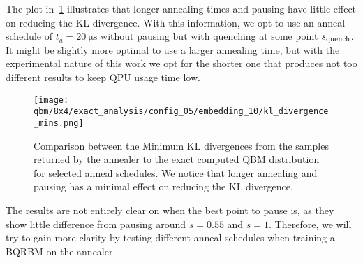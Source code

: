 The plot in~\cref{fig:dkl_mins_embedding_05} illustrates that longer annealing times and pausing have little effect on reducing the KL divergence.
With this information, we opt to use an anneal schedule of \( t_a = 20 \ \si{\micro\second} \) without pausing but with quenching at some point \( s_{\text{quench}} \).
It might be slightly more optimal to use a larger annealing time, but with the experimental nature of this work we opt for the shorter one that produces not too different results to keep QPU usage time low.

\begin{figure}[!htb]
    \begin{center}
        \texttt{[image: qbm/8x4/exact\_analysis/config\_05/embedding\_10/kl\_divergence\_mins.png]}
    \end{center}
    \caption{Comparison between the Minimum KL divergences from the samples returned by the annealer to the exact computed QBM distribution for selected anneal schedules. We notice that longer annealing and pausing has a minimal effect on reducing the KL divergence.}
    \label{fig:dkl_mins_embedding_05}
\end{figure}

The results are not entirely clear on when the best point to pause is, as they show little difference from pausing around \( s = 0.55 \) and \( s = 1 \).
Therefore, we will try to gain more clarity by testing different anneal schedules when training a BQRBM on the annealer.

